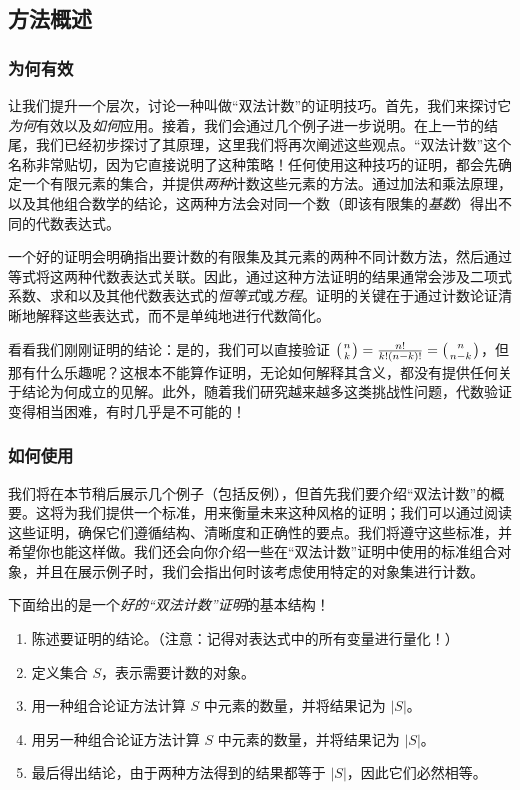 
\subsection{方法概述}

\subsubsection*{为何有效}

让我们提升一个层次，讨论一种叫做``双法计数''的证明技巧。首先，我们来探讨它\emph{为何}有效以及\emph{如何}应用。接着，我们会通过几个例子进一步说明。在上一节的结尾，我们已经初步探讨了其原理，这里我们将再次阐述这些观点。``双法计数''这个名称非常贴切，因为它直接说明了这种策略！任何使用这种技巧的证明，都会先确定一个有限元素的集合，并提供\emph{两种}计数这些元素的方法。通过加法和乘法原理，以及其他组合数学的结论，这两种方法会对同一个数（即该有限集的\emph{基数}）得出不同的代数表达式。

一个好的证明会明确指出要计数的有限集及其元素的两种不同计数方法，然后通过等式将这两种代数表达式关联。因此，通过这种方法证明的结果通常会涉及二项式系数、求和以及其他代数表达式的\emph{恒等式}或\emph{方程}。证明的关键在于通过计数论证清晰地解释这些表达式，而不是单纯地进行代数简化。

看看我们刚刚证明的结论：是的，我们可以直接验证 $\big({n \atop k}\big) = \frac{n!}{k!(n-k)!} = \big({n \atop n-k}\big)$，但那有什么乐趣呢？这根本不能算作证明，无论如何解释其含义，都没有提供任何关于结论为何成立的见解。此外，随着我们研究越来越多这类挑战性问题，代数验证变得相当困难，有时几乎是不可能的！

\subsubsection*{如何使用}

我们将在本节稍后展示几个例子（包括反例），但首先我们要介绍``双法计数''的概要。这将为我们提供一个标准，用来衡量未来这种风格的证明；我们可以通过阅读这些证明，确保它们遵循结构、清晰度和正确性的要点。我们将遵守这些标准，并希望你也能这样做。我们还会向你介绍一些在``双法计数''证明中使用的标准组合对象，并且在展示例子时，我们会指出何时该考虑使用特定的对象集进行计数。

下面给出的是一个\emph{好的``双法计数''证明}的基本结构！

\begin{enumerate}
    \item 陈述要证明的结论。（注意：记得对表达式中的所有变量进行量化！）
    \item 定义集合 $S$，表示需要计数的对象。
    \item 用一种组合论证方法计算 $S$ 中元素的数量，并将结果记为 $|S|$。
    \item 用另一种组合论证方法计算 $S$ 中元素的数量，并将结果记为 $|S|$。
    \item 最后得出结论，由于两种方法得到的结果都等于 $|S|$，因此它们必然相等。
\end{enumerate}

